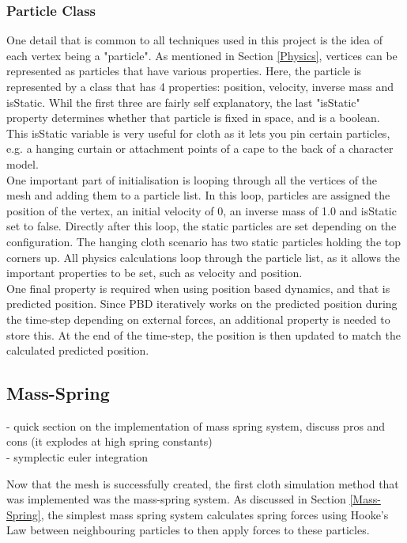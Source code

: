 \documentclass[12pt,a4paper]{article}
\begin{document}
\subsubsection{Particle Class}
One detail that is common to all techniques used in this project is the idea of each vertex being a "particle". As mentioned in Section \ref{Physics}, vertices can be represented as particles that have various properties. Here, the particle is represented by a class that has 4 properties: position, velocity, inverse mass and isStatic. Whil the first three are fairly self explanatory, the last "isStatic" property determines whether that particle is fixed in space, and is a boolean. This isStatic variable is very useful for cloth as it lets you pin certain particles, e.g. a hanging curtain or attachment points of a cape to the back of a character model. \\

One important part of initialisation is looping through all the vertices of the mesh and adding them to a particle list. In this loop, particles are assigned the position of the vertex, an initial velocity of 0, an inverse mass of 1.0 and isStatic set to false. Directly after this loop, the static particles are set depending on the configuration. The hanging cloth scenario has two static particles holding the top corners up. All physics calculations loop through the particle list, as it allows the important properties to be set, such as velocity and position.
\\
One final property is required when using position based dynamics, and that is predicted position. Since PBD iteratively works on the predicted position during the time-step depending on external forces, an additional property is needed to store this. At the end of the time-step, the position is then updated to match the calculated predicted position.
\subsection{Mass-Spring}
- quick section on the implementation of mass spring system, discuss pros and cons (it explodes at high spring constants)\\
- symplectic euler integration

Now that the mesh is successfully created, the first cloth simulation method that was implemented was the mass-spring system. As discussed in Section \ref{Mass-Spring}, the simplest mass spring system calculates spring forces using Hooke's Law between neighbouring particles to then apply forces to these particles.
\end{document}
